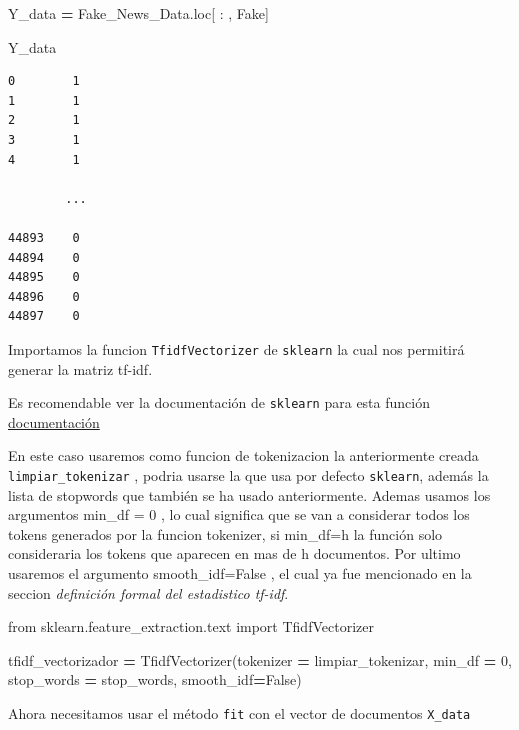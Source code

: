 \documentclass[
  11pt,
  a4paper,
]{article}
\newenvironment{Shaded}{\begin{snugshade}}{\end{snugshade}}
\newcommand{\DecValTok}[1]{\textcolor[rgb]{0.00,0.00,0.81}{#1}}
\newcommand{\ImportTok}[1]{#1}
\newcommand{\NormalTok}[1]{#1}
\newcommand{\OperatorTok}[1]{\textcolor[rgb]{0.81,0.36,0.00}{\textbf{#1}}}
\newcommand{\StringTok}[1]{\textcolor[rgb]{0.31,0.60,0.02}{#1}}
\newcommand{\VariableTok}[1]{\textcolor[rgb]{0.00,0.00,0.00}{#1}}
\begin{document}
\begin{Shaded}
\begin{Highlighting}[]
\NormalTok{Y\_data }\OperatorTok{=}\NormalTok{ Fake\_News\_Data.loc[ : , }\StringTok{\textquotesingle{}Fake\textquotesingle{}}\NormalTok{]}

\NormalTok{Y\_data}
\end{Highlighting}
\end{Shaded}

\begin{verbatim}
0        1
1        1
2        1
3        1
4        1

        ...

44893    0
44894    0
44895    0
44896    0
44897    0
\end{verbatim}

Importamos la funcion \texttt{TfidfVectorizer} de \texttt{sklearn} la
cual nos permitirá generar la matriz tf-idf.

Es recomendable ver la documentación de \texttt{sklearn} para esta
función
\href{https://scikit-learn.org/stable/modules/generated/sklearn.feature_extraction.text.TfidfVectorizer.html}{documentación}

En este caso usaremos como funcion de tokenizacion la anteriormente
creada \texttt{limpiar\_tokenizar} , podria usarse la que usa por
defecto \texttt{sklearn}, además la lista de stopwords que también se ha
usado anteriormente. Ademas usamos los argumentos min\_df = 0 , lo cual
significa que se van a considerar todos los tokens generados por la
funcion tokenizer, si min\_df=h la función solo consideraria los tokens
que aparecen en mas de h documentos. Por ultimo usaremos el argumento
smooth\_idf=False , el cual ya fue mencionado en la seccion
\emph{definición formal del estadistico tf-idf}.

\begin{Shaded}
\begin{Highlighting}[]
\ImportTok{from}\NormalTok{ sklearn.feature\_extraction.text }\ImportTok{import}\NormalTok{ TfidfVectorizer}

\NormalTok{tfidf\_vectorizador }\OperatorTok{=}\NormalTok{ TfidfVectorizer(tokenizer  }\OperatorTok{=}\NormalTok{ limpiar\_tokenizar, min\_df }\OperatorTok{=} \DecValTok{0}\NormalTok{, stop\_words }\OperatorTok{=}\NormalTok{ stop\_words, smooth\_idf}\OperatorTok{=}\VariableTok{False}\NormalTok{)}
\end{Highlighting}
\end{Shaded}

Ahora necesitamos usar el método \texttt{fit} con el vector de
documentos \texttt{X\_data}
\end{document}
